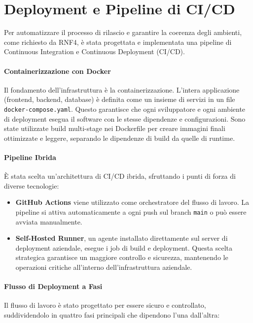 \documentclass[12pt,a4paper,openright,twoside]{book}
\begin{document}
\section{Deployment e Pipeline di CI/CD}
\label{sec:ci_cd}
Per automatizzare il processo di rilascio e garantire la coerenza degli ambienti, come richiesto da RNF4, è stata progettata e implementata una pipeline di Continuous Integration e Continuous Deployment (CI/CD).

\paragraph{Containerizzazione con Docker}
Il fondamento dell'infrastruttura è la containerizzazione. L'intera applicazione (frontend, backend, database) è definita come un insieme di servizi in un file \texttt{docker-compose.yaml}. Questo garantisce che ogni sviluppatore e ogni ambiente di deployment esegua il software con le stesse dipendenze e configurazioni. Sono state utilizzate build multi-stage nei Dockerfile per creare immagini finali ottimizzate e leggere, separando le dipendenze di build da quelle di runtime.

\paragraph{Pipeline Ibrida}
È stata scelta un'architettura di CI/CD ibrida, sfruttando i punti di forza di diverse tecnologie:
\begin{itemize}
    \item \textbf{GitHub Actions} viene utilizzato come orchestratore del flusso di lavoro. La pipeline si attiva automaticamente a ogni push sul branch \texttt{main} o può essere avviata manualmente.
    \item \textbf{Self-Hosted Runner}, un agente installato direttamente sul server di deployment aziendale, esegue i job di build e deployment. Questa scelta strategica garantisce un maggiore controllo e sicurezza, mantenendo le operazioni critiche all'interno dell'infrastruttura aziendale.
\end{itemize}

\paragraph{Flusso di Deployment a Fasi} Il flusso di lavoro è stato progettato per essere sicuro e controllato, suddividendolo in quattro fasi principali che dipendono l'una dall'altra:
\end{document}
